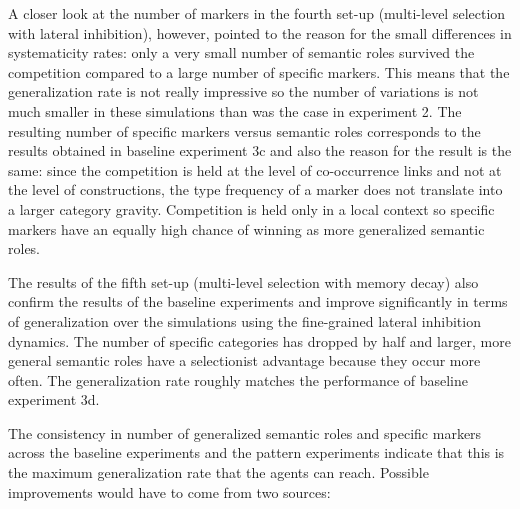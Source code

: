 A closer look at the number of markers in the fourth set-up (multi-level selection with lateral inhibition), however, pointed to the reason for the small differences in systematicity rates: only a very small number of semantic roles survived the competition compared to a large number of specific markers. This means that the generalization rate is not really impressive so the number of variations is not much smaller in these simulations than was the case in experiment 2. The resulting number of specific mar\-kers versus semantic roles corresponds to the results obtained in baseline experiment 3c and also the reason for the result is the same: since the competition is held at the level of co-occurrence links and not at the level of constructions, the type frequency of a marker does not translate into a larger category gravity. Competition is held only in a local context so specific mar\-kers have an equally high chance of winning as more generalized semantic roles.

The results of the fifth set-up (multi-level selection with memory decay) also confirm the results of the baseline experiments and improve significantly in terms of generalization over the simulations using the fine-grained lateral inhibition dynamics. The number of specific categories has dropped by half and larger, more general semantic roles have a selectionist advantage because they occur more often. The generalization rate roughly matches the performance of baseline experiment 3d.

The consistency in number of generalized semantic roles and specific markers across the baseline experiments and the pattern experiments indicate that this is the maximum generalization rate that the agents can reach. Possible improvements would have to come from two sources:

